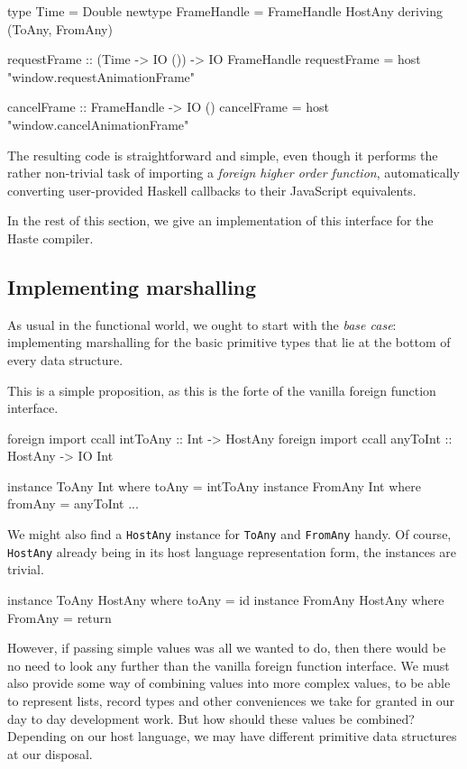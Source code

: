 \documentclass[preprint]{sigplanconf}
\begin{document}
\begin{code}
  type Time = Double
  newtype FrameHandle = FrameHandle HostAny
    deriving (ToAny, FromAny)

  requestFrame :: (Time -> IO ()) -> IO FrameHandle
  requestFrame = host "window.requestAnimationFrame"

  cancelFrame :: FrameHandle -> IO ()
  cancelFrame = host "window.cancelAnimationFrame"
\end{code}

The resulting code is straightforward and simple, even though it performs
the rather non-trivial task of importing a \emph{foreign higher order function},
automatically converting user-provided Haskell callbacks to their JavaScript
equivalents.

In the rest of this section, we give an implementation of this interface for
the Haste compiler.

\subsection{Implementing marshalling}\label{sec:marshalling}
As usual in the functional world, we ought to start with the \emph{base case}:
implementing marshalling for the basic primitive types that lie at the bottom
of every data structure.

This is a simple proposition, as this is the forte of the vanilla foreign
function interface.

\begin{code}
  foreign import ccall intToAny :: Int -> HostAny
  foreign import ccall anyToInt :: HostAny -> IO Int

  instance ToAny Int where toAny = intToAny
  instance FromAny Int where fromAny = anyToInt
  ...
\end{code}

We might also find a \lstinline!HostAny! instance for \lstinline!ToAny!
and \lstinline!FromAny! handy. Of course, \lstinline!HostAny! already being
in its host language representation form, the instances are trivial.

\begin{code}
  instance ToAny HostAny where toAny = id
  instance FromAny HostAny where FromAny = return
\end{code}

However, if passing simple values was all we wanted to do, then there would be
no need to look any further than the vanilla foreign function interface.
We must also provide some way of combining values into more complex values,
to be able to represent lists, record types and other conveniences we take for
granted in our day to day development work.
But how should these values be combined? Depending on our host language, we
may have different primitive data structures at our disposal.
\end{document}
